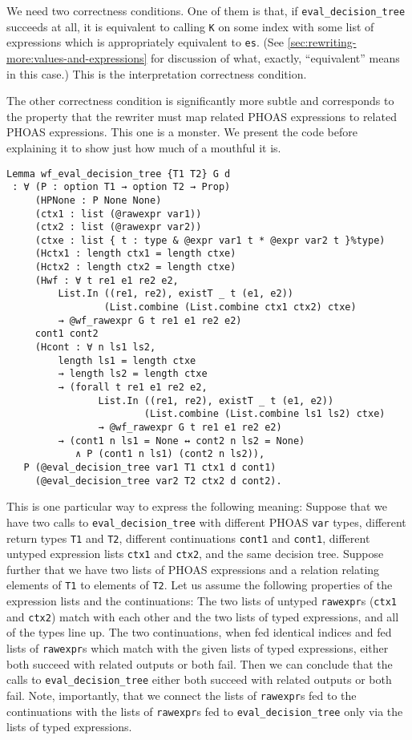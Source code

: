 We need two correctness conditions.
One of them is that, if \texttt{eval_decision_tree} succeeds at all, it is equivalent to calling \texttt{K} on some index with some list of expressions which is appropriately equivalent to \texttt{es}.
(See \autoref{sec:rewriting-more:values-and-expressions} for discussion of what, exactly, ``equivalent'' means in this case.)
This is the interpretation correctness condition.

The other correctness condition is significantly more subtle and corresponds to the property that the rewriter must map related PHOAS expressions to related PHOAS expressions.
This one is a monster.
We present the code before explaining it to show just how much of a mouthful it is.
\begin{verbatim}
Lemma wf_eval_decision_tree {T1 T2} G d
 : ∀ (P : option T1 → option T2 → Prop)
     (HPNone : P None None)
     (ctx1 : list (@rawexpr var1))
     (ctx2 : list (@rawexpr var2))
     (ctxe : list { t : type & @expr var1 t * @expr var2 t }%type)
     (Hctx1 : length ctx1 = length ctxe)
     (Hctx2 : length ctx2 = length ctxe)
     (Hwf : ∀ t re1 e1 re2 e2,
         List.In ((re1, re2), existT _ t (e1, e2))
                 (List.combine (List.combine ctx1 ctx2) ctxe)
         → @wf_rawexpr G t re1 e1 re2 e2)
     cont1 cont2
     (Hcont : ∀ n ls1 ls2,
         length ls1 = length ctxe
         → length ls2 = length ctxe
         → (forall t re1 e1 re2 e2,
                List.In ((re1, re2), existT _ t (e1, e2))
                        (List.combine (List.combine ls1 ls2) ctxe)
                → @wf_rawexpr G t re1 e1 re2 e2)
         → (cont1 n ls1 = None ↔ cont2 n ls2 = None)
            ∧ P (cont1 n ls1) (cont2 n ls2)),
   P (@eval_decision_tree var1 T1 ctx1 d cont1)
     (@eval_decision_tree var2 T2 ctx2 d cont2).
\end{verbatim}
This is one particular way to express the following meaning:
Suppose that we have two calls to \texttt{eval_decision_tree} with different PHOAS \texttt{var} types, different return types \texttt{T1} and \texttt{T2}, different continuations \texttt{cont1} and \texttt{cont1}, different untyped expression lists \texttt{ctx1} and \texttt{ctx2}, and the same decision tree.
Suppose further that we have two lists of PHOAS expressions and a relation relating elements of \texttt{T1} to elements of \texttt{T2}.
Let us assume the following properties of the expression lists and the continuations:
The two lists of untyped \texttt{rawexpr}s (\texttt{ctx1} and \texttt{ctx2}) match with each other and the two lists of typed expressions, and all of the types line up.
The two continuations, when fed identical indices and fed lists of \texttt{rawexpr}s which match with the given lists of typed expressions, either both succeed with related outputs or both fail.
Then we can conclude that the calls to \texttt{eval_decision_tree} either both succeed with related outputs or both fail.
Note, importantly, that we connect the lists of \texttt{rawexpr}s fed to the continuations with the lists of \texttt{rawexpr}s fed to \texttt{eval_decision_tree} only via the lists of typed expressions.

